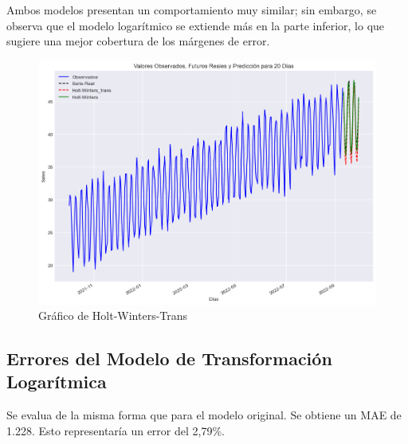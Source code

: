 Ambos modelos presentan un comportamiento muy similar; sin embargo, se observa que el modelo logarítmico se extiende más en la parte inferior, lo que sugiere una mejor cobertura de los márgenes de error.
\begin{figure}[h]
	\centering
	\includegraphics[width=0.7\linewidth]{holt_winters_log}
	\caption{Gráfico de Holt-Winters-Trans}
	\label{fig:holtwinterslog}
\end{figure}

\subsection{Errores del Modelo de Transformación Logarítmica}
Se evalua de la misma forma que para el modelo original. Se obtiene un MAE de 1.228. Esto representaría un error del 2,79\%.

